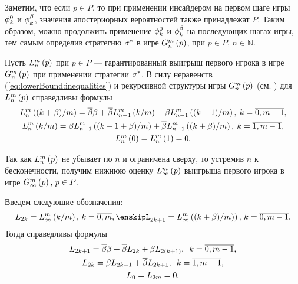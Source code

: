 Заметим, что если $p \in P$, то при применении инсайдером на первом шаге игры
$\fEven$ и $\fOdd$, значения апостериорных вероятностей также принадлежат $P$.
Таким образом, можно продолжить применение $\fEven$ и $\fOdd$ на последующих
шагах игры, тем самым определив стратегию $\fOpt$ в игре $\generalGame{n}{p}$,
при $p \in P, \, n \in \mathbb{N}$.

Пусть $\lowerBound[n]{p}$ при $p \in P$ --- гарантированный выигрыш первого
игрока в игре $\generalGame{n}{p}$ при применении стратегии $\fOpt$. В силу
неравенств (\ref{eq:lowerBound:inequalities}) и рекурсивной структуры игры
$\generalGame{n}{p}$ (см. \cite{domansky07}) для $\lowerBound[n]{p}$ справедливы
формулы
\begin{equation}
  \begin{gathered}
    \label{eq:lowerBound:recurrence:function}
    \lowerBound[n]{(k + \Co)/m} = \DCo\Co + \DCo\lowerBound[n-1]{k/m} +
    \Co\lowerBound[n-1]{(k + 1)/m}, \: k = \overline{0, m-1}, \\
    \lowerBound[n]{k/m} = \Co\lowerBound[n-1]{(k - 1 + \Co)/m} +
    \DCo\lowerBound[n-1]{(k + \Co)/m}, \: k = \overline{1, m-1}, \\
    \lowerBound[n]{0} = \lowerBound[n]{1} = 0.
  \end{gathered}
\end{equation}

Так как $\lowerBound[n]{p}$ не убывает по $n$ и ограничена сверху, то устремив
$n$ к бесконечности, получим нижнюю оценку $\lowerBound{p}$ выигрыша первого
игрока в игре $\infiniteGame{p}, \, p \in P$.

Введем следующие обозначения:
\[
  L_{2k} = \lowerBound{k/m}, \, k = \overline{0,m}, \enskip%
  L_{2k+1} = \lowerBound{(k+\Co)/m)}, \, k = \overline{0,m-1}.
\]
Тогда справедливы формулы
\begin{equation}
  \label{eq:lowerRecurrence}
  \begin{gathered}
    L_{2k+1} = \DCo\Co + \DCo L_{2k} + \Co L_{2(k+1)}, \enskip k = \overline{0, m-1},\\
    L_{2k} = \Co L_{2k-1} + \DCo L_{2k+1}, \enskip k = \overline{1, m-1},\\
    L_0 = L_{2m} = 0.
  \end{gathered}
\end{equation}


